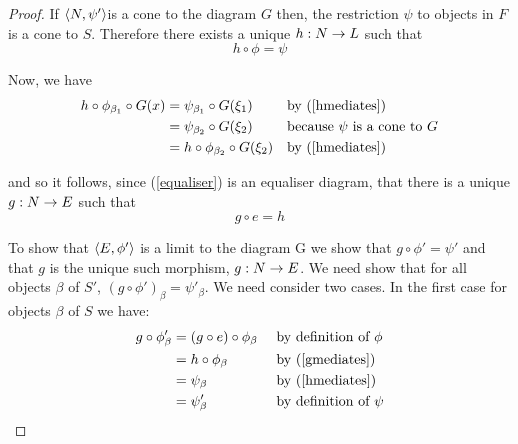 \documentclass[10pt,a4paper]{article}
\begin{document}
\begin{proof}
If $\left\langle N,\psi'\right\rangle$is a cone to the diagram $G$ then, the restriction $\psi$ to objects in $F$ is a cone to  $S$. Therefore there exists a unique $h : N \rightarrow L$ such that 
\begin{equation}
\label{hmediates}
h \circ \phi = \psi
\end{equation}

\noindent
Now, we have 
\begin{align*}
h \circ \phi_{\beta_1} \circ G(x)
             & = \psi_{\beta_1} \circ G(\xi_1)         && \mbox{by (\ref{hmediates})}\\
             & = \psi_{\beta_2} \circ G(\xi_2)         && \mbox{because } \psi \mbox{ is a cone to } G \\
             & = h \circ \phi_{\beta_2} \circ G(\xi_2) && \mbox{by (\ref{hmediates}) }\\
\end{align*}

\noindent
and so it follows, since (\ref{equaliser}) is an equaliser diagram,
that there is a unique $g: N \rightarrow E$ such that 
\begin{equation}
\label{gmediates}
g \circ e = h
\end{equation}

\noindent
To show that $\left\langle E,\phi'\right\rangle$ is a limit to the diagram G we show that 
$g \circ \phi' = \psi'$ and that $g$ is the unique such morphism,
$g: N \rightarrow E$.
\noindent
We need show that for all objects $\beta$ of $S'$,  $(g \circ \phi')_\beta =\psi'_\beta$. 
We need consider two cases. In the first case for objects $\beta$ of $S$ we have:
\begin{align*}
g \circ \phi'_\beta
             & = (g \circ e) \circ \phi_\beta   &&  \mbox{ by definition of } \phi\\
             & = h \circ \phi_\beta             && \mbox{ by (\ref{gmediates})}   \\
             & = \psi_\beta                     && \mbox{ by (\ref{hmediates})}   \\
						 & = \psi'_\beta                    && \mbox{ by definition of } \psi\\
\end{align*}


\end{proof}
\end{document}
